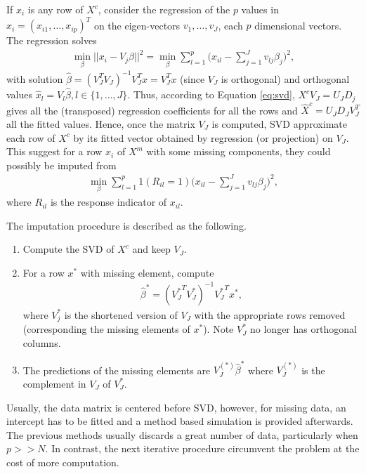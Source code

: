 If $x_i$ is any row of $X^c$, consider the regression of the $p$ values in
$x_i=(x_{i1}, \dots, x_{ip})^T$ on the eigen-vectors $v_1, \dots, v_J$, each $p$
dimensional vectors. The regression solves
\begin{align*}%
\min_{\beta} \vert\vert x_{i} - V_j\beta \vert\vert^2 =
  \min_{\beta} \sum_{l=1}^p \big(x_{il} - \sum_{j=1}^J v_{lj}\beta_j \big)^2,
\end{align*}
with solution $\hat \beta = (V_J^T V_J)^{-1} V_J^T x = V_J^T x$ (since $V_J$ is
orthogonal) and orthogonal values $\hat x_l = V_l\hat\beta, l \in \{1, \dots, J
\}$. Thus, according to Equation \eqref{eq:svd}, $X^cV_J = U_JD_j$ gives all
the (transposed) regression coefficients for all the rows and $\hat X^c =
U_JD_JV_J^T$ all the fitted values. Hence, once the matrix $V_J$ is computed,
SVD approximate each row of $X^c$ by its fitted vector obtained by regression
(or projection) on $V_J$. This suggest for a row $x_i$ of $X^m$ with some missing
components, they could possibly be imputed from
\begin{align*}
\min_{\beta} \sum_{l=1}^p 1(R_{il}=1) \big(x_{il} - \sum_{j=1}^J v_{lj}\beta_j \big)^2,
\end{align*}
where $R_{il}$ is the response indicator of $x_{il}$.

The imputation procedure is described as the following.
\begin{enumerate}
\item Compute the SVD of $X^c$ and keep $V_J$.
\item For a row $x^*$ with missing element, compute
  \begin{align*}
    \hat\beta^* = ({V_J^{*}}^{T} V_J^*)^{-1} {V_J^*}^{T} x^*,
  \end{align*}
  where $V_j^*$ is the shortened version of $V_J$ with the appropriate rows
  removed (corresponding the missing elements of $x^*$). Note $V_J^{*}$ no
  longer has orthogonal columns.

\item The predictions of the missing elements are $V_J^{(*)}\hat\beta^*$ where
  $V_J^{(*)}$ is the complement in $V_J$ of $V_J^{*}$.
\end{enumerate}

Usually, the data matrix is centered before SVD, however, for missing data, an
intercept has to be fitted and a method based simulation is provided
afterwards. The previous methods usually discards a great number of data,
particularly when $p >> N$. In contrast, the next iterative procedure
circumvent the problem at the cost of more computation.

